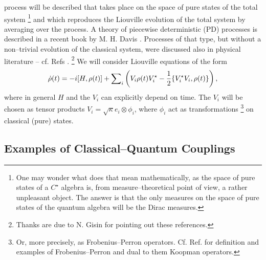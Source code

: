 \documentclass[12pt]{article}
\def\be{\begin{equation}} \def\ee{\end{equation}}
\begin{document}
process  will be described that takes place on the space of pure
states of the total system%
\footnote{One may wonder what does that mean mathematically, as
the space of pure states of a $C^{\star}$ algebra is, from
measure--theoretical point of view, a rather
unpleasant object. The answer is that the only measures on the
space of pure states of the quantum algebra will be the Dirac
measures.}
 and which reproduces the Liouville
evolution of the total system by averaging over the process.
A theory of piecewise
deterministic  (PD) processes is described in a recent book by M. H. 
Davis \cite{dav}.  Processes of that type,  but without a non--trivial
evolution of the classical system,  were discussed also in physical
literature -- cf.  Refs \cite{car,dal,dum,gar}.%
\footnote{Thanks are due to N.  Gisin for pointing out these
references. }
We will consider Liouville equations of the form
\be {\dot \rho} (t) = -i[H , \rho  (t)] + {\sum}_{i} \left  ( V_i
\rho  (t) V_i^{\star} - {1 \over 2}
\{V_i^{\star} V_i ,  \rho  (t)\}
\right ) ,  \label{eq: lio}\ee  where in  general $H$ and the $V_i$ can
explicitly depend on time. 
The $V_i$ will be chosen as tensor products
$V_i=\sqrt{\kappa} e_i\otimes\phi_i$,  where
$\phi_i$ act as transformations%
\footnote{Or, more precisely, as Frobenius--Perron operators. Cf.
Ref.\cite{las} for definition and examples of Frobenius--Perron and
dual to them Koopman operators.} 
 on classical  (pure) states. 
\subsection{Examples of Classical--Quantum Couplings}
\end{document}
